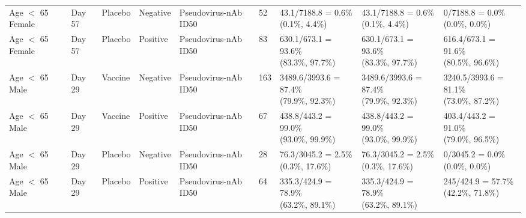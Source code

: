 \documentclass[]{book}
\theoremstyle{definition}
\theoremstyle{definition}
\theoremstyle{definition}
\newcommand{\1}{\mathbbm{1}}
\begin{document}
\begin{landscape}
\begin{ThreePartTable}
\begin{longtable}[t]{>{\raggedright\arraybackslash}p{2.7cm}llllllll}
\hspace{1em}Age $<$ 65 Female & Day 57 & Placebo & Negative & Pseudovirus-nAb ID50 & 52 & \makecell[l]{43.1/7188.8 = 0.6\%\\(0.1\%, 4.4\%)} & \makecell[l]{43.1/7188.8 = 0.6\%\\(0.1\%, 4.4\%)} & \makecell[l]{0/7188.8 = 0.0\%\\(0.0\%, 0.0\%)}\\
\hspace{1em}Age $<$ 65 Female & Day 57 & Placebo & Positive & Pseudovirus-nAb ID50 & 83 & \makecell[l]{630.1/673.1 = 93.6\%\\(83.3\%, 97.7\%)} & \makecell[l]{630.1/673.1 = 93.6\%\\(83.3\%, 97.7\%)} & \makecell[l]{616.4/673.1 = 91.6\%\\(80.5\%, 96.6\%)}\\
\hspace{1em}Age $<$ 65 Male & Day 29 & Vaccine & Negative & Pseudovirus-nAb ID50 & 163 & \makecell[l]{3489.6/3993.6 = 87.4\%\\(79.9\%, 92.3\%)} & \makecell[l]{3489.6/3993.6 = 87.4\%\\(79.9\%, 92.3\%)} & \makecell[l]{3240.5/3993.6 = 81.1\%\\(73.0\%, 87.2\%)}\\
\hspace{1em}Age $<$ 65 Male & Day 29 & Vaccine & Positive & Pseudovirus-nAb ID50 & 67 & \makecell[l]{438.8/443.2 = 99.0\%\\(93.0\%, 99.9\%)} & \makecell[l]{438.8/443.2 = 99.0\%\\(93.0\%, 99.9\%)} & \makecell[l]{403.4/443.2 = 91.0\%\\(79.0\%, 96.5\%)}\\
\hspace{1em}Age $<$ 65 Male & Day 29 & Placebo & Negative & Pseudovirus-nAb ID50 & 28 & \makecell[l]{76.3/3045.2 = 2.5\%\\(0.3\%, 17.6\%)} & \makecell[l]{76.3/3045.2 = 2.5\%\\(0.3\%, 17.6\%)} & \makecell[l]{0/3045.2 = 0.0\%\\(0.0\%, 0.0\%)}\\
\hspace{1em}Age $<$ 65 Male & Day 29 & Placebo & Positive & Pseudovirus-nAb ID50 & 64 & \makecell[l]{335.3/424.9 = 78.9\%\\(63.2\%, 89.1\%)} & \makecell[l]{335.3/424.9 = 78.9\%\\(63.2\%, 89.1\%)} & \makecell[l]{245/424.9 = 57.7\%\\(42.2\%, 71.8\%)}\\

\end{longtable}
\end{ThreePartTable}
\end{landscape}
\end{document}
